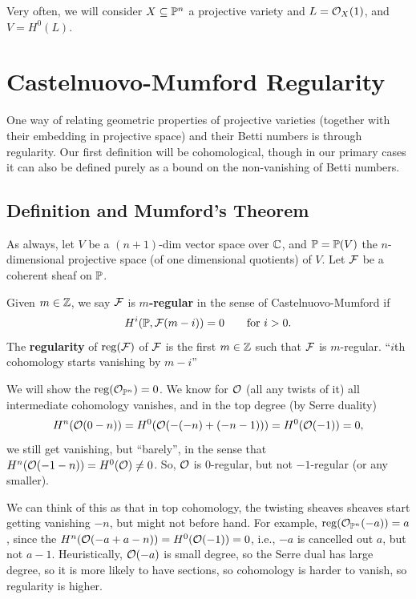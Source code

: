 \documentclass[12pt]{article}
\newcommand{\reg}{\mathrm{reg}}
\begin{document}
\begin{rmk}
    Very often, we will consider $X\subseteq \P^n$ a projective variety and $L=\cO_X(1)$, and $V=H^0(L)$.
\end{rmk}


\section{Castelnuovo-Mumford Regularity}

One way of relating geometric properties of projective varieties (together with their embedding in projective space) and their Betti numbers is through regularity. Our first definition will be cohomological, though in our primary cases it can also be defined purely as a bound on the non-vanishing of Betti numbers.

\subsection{Definition and Mumford's Theorem}

As always, let $V$ be a $(n+1)$-dim vector space over $\C$, and $\P=\P(V)$ the $n$-dimensional projective space (of one dimensional quotients) of $V$. Let $\cF$ be a coherent sheaf on $\P$.

\begin{defn}
    Given $m\in \Z$, we say $\cF$ is \textbf{$m$-regular} in the sense of Castelnuovo-Mumford if
    \[H^i(\P,\cF(m-i))=0 \qquad \text{for $i>0$}.\]
    The \textbf{regularity} of $\reg(\cF)$ of $\cF$ is the first $m\in \Z$ such that $\cF$ is $m$-regular. ``$i$th cohomology starts vanishing by $m-i$''
\end{defn}

\begin{eg}
    We will show the $\reg(\cO_{\P^n})=0$. We know for $\cO$ (all any twists of it) all intermediate cohomology vanishes, and in the top degree (by Serre duality)
    \[H^n(\cO(0-n))=H^0(\cO(-(-n)+(-n-1)))=H^0(\cO(-1))=0,\]
    we still get vanishing, but ``barely'', in the sense that $H^n(\cO(-1-n))=H^0(\cO)\neq 0$. So, $\cO$ is $0$-regular, but not $-1$-regular (or any smaller).
    
    We can think of this as that in top cohomology, the twisting sheaves sheaves start getting vanishing $-n$, but might not before hand. For example, $\reg(\cO_{\P^n}(-a))=a$, since the $H^n(\cO(-a+a-n))=H^0(\cO(-1))=0$, i.e., $-a$ is cancelled out $a$, but not $a-1$. Heuristically, $\cO(-a)$ is small degree, so the Serre dual has large degree, so it is more likely to have sections, so cohomology is harder to vanish, so regularity is higher.
\end{eg}
\end{document}
